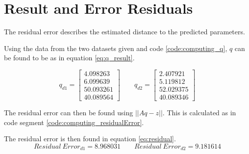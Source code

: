 \section{Result and Error Residuals}
The residual error describes the estimated distance to the predicted parameters.



Using the data from the two datasets given and code \ref{code:computing_q}, $q$ can be found to be as in equation \ref{eq:q_result}.



        
        
 

\begin{equation}
q_{d1} = 
\left[
\begin{array}{c}
4.098263 \\
6.099639 \\
50.093261 \\
40.089564
\end{array}
\right]
% 
\qquad
% 
q_{d2} = 
\left[
\begin{array}{c}
2.407921\\
5.119812\\
52.029375\\ 
40.089346
\end{array}
\right]
\label{eq:q_result}
\end{equation}

The residual error can then be found using $|| Aq - z ||$.
This is calculated as in code segment \ref{code:computing_residualError}.



The residual error is then found in equation \ref{eq:residual}.
\begin{equation}
Residual\ Error_{d1} = 8.968031 
% 
\qquad
% 
Residual\ Error_{d2} = 9.181614
\label{eq:residual}
\end{equation}

